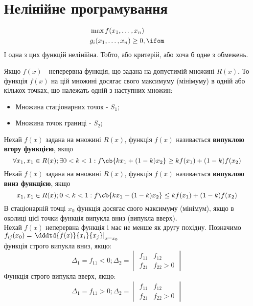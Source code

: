 \chapter{Нелінійне програмування}
\begin{eqnarray}
&\max f(x_1,\ldots,x_n)\\
&g_i(x_1,\ldots,x_n)\geq0,\ifom
\end{eqnarray}
І одна з цих функцій нелінійна. Тобто, або критерій, або хоча б одне з обмежень.\\
\begin{teor}
Якщо $f(x)$ - неперервна функція, що задана на допустимій множині $R(x)$. То функція $f(x)$ на цій множині досягає свого максимуму (мінімуму) в одній або кількох точках, що належать одній з наступних множин: 
\begin{itemize}
\item Множина стаціонарних точок - $S_1$;
\item Множина точок границі - $S_2$;
\end{itemize}
\end{teor}
Нехай $f(x)$ задана на множині $R(x)$, функція $f(x)$ називається \textbf{випуклою вгору функцією}, якщо 
\begin{equation}
\forall x_1,x_1\in R(x);\exists 0<k<1: f\cb{kx_1+(1-k)x_2} \geq kf(x_1)+(1-k) f(x_2)
\end{equation}
Нехай $f(x)$ задана на множині $R(x)$, функція $f(x)$ називається \textbf{випуклою вниз функцією}, якщо 
\begin{equation}
x_1,x_1\in R(x);0<k<1: f\cb{kx_1+(1-k)x_2} \leq kf(x_1)+(1-k) f(x_2)
\end{equation}
В стаціонарній точці $x_0$ функція досягає свого максимуму (мінімум), якщо в околиці цієї точки функція випукла вниз (випукла вверх).\\
Нехай $f(x)$ неперервна функція і має не менше як другу похідну. Позначимо $f_{ij}(x_0) = \left.\dddtd {f(x)}{x_i}{x_j}\right|_{x=x_0}$\\
функція строго випукла вниз, якщо:
\begin{equation*}
\Delta_1 = f_{11} <0; \Delta_2 = \begin{vmatrix}
f_{11} & f_{12} \\ f_{21} & f_{22}>0
\end{vmatrix}
\end{equation*}
Функція строго випукла вверх, якщо:
\begin{equation*}
\Delta_1 = f_{11} >0; \Delta_2 = \begin{vmatrix}
f_{11} & f_{12} \\ f_{21} & f_{22}>0
\end{vmatrix}
\end{equation*}
